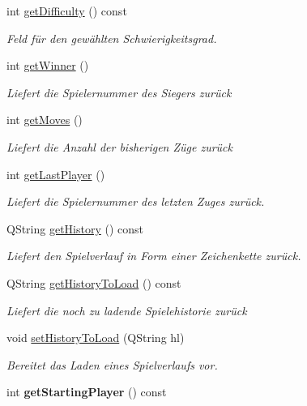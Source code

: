 \begin{DoxyCompactItemize}
\item 
int \hyperlink{class_connect_four_a460f6063899b4e5a7e2171ab310a449b}{get\-Difficulty} () const 
\begin{DoxyCompactList}\small\item\em Feld für den gewählten Schwierigkeitsgrad. \end{DoxyCompactList}\item 
int \hyperlink{class_connect_four_a5b3cc0a97ca9722eb49266e651cdcf3b}{get\-Winner} ()
\begin{DoxyCompactList}\small\item\em Liefert die Spielernummer des Siegers zurück \end{DoxyCompactList}\item 
int \hyperlink{class_connect_four_a88586e2245c07b08979f258bb24c9c17}{get\-Moves} ()
\begin{DoxyCompactList}\small\item\em Liefert die Anzahl der bisherigen Züge zurück \end{DoxyCompactList}\item 
int \hyperlink{class_connect_four_a102316e1b99e7d1eddbe36340ca14544}{get\-Last\-Player} ()
\begin{DoxyCompactList}\small\item\em Liefert die Spielernummer des letzten Zuges zurück. \end{DoxyCompactList}\item 
Q\-String \hyperlink{class_connect_four_aa47ee15206dfa8e942e28ec38428e507}{get\-History} () const 
\begin{DoxyCompactList}\small\item\em Liefert den Spielverlauf in Form einer Zeichenkette zurück. \end{DoxyCompactList}\item 
Q\-String \hyperlink{class_connect_four_af2ba0a09293dccc56439a1f3f76b2c50}{get\-History\-To\-Load} () const 
\begin{DoxyCompactList}\small\item\em Liefert die noch zu ladende Spielehistorie zurück \end{DoxyCompactList}\item 
void \hyperlink{class_connect_four_ab31edf162a4035383b8034f2c65d65b5}{set\-History\-To\-Load} (Q\-String hl)
\begin{DoxyCompactList}\small\item\em Bereitet das Laden eines Spielverlaufs vor. \end{DoxyCompactList}\item 
\hypertarget{class_connect_four_a6a366a01f3c7dcb75441b604df4bed51}{int {\bfseries get\-Starting\-Player} () const }\label{class_connect_four_a6a366a01f3c7dcb75441b604df4bed51}

\end{DoxyCompactItemize}
